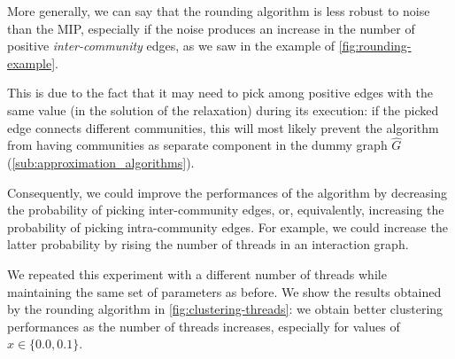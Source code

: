 More generally, we can say that the rounding algorithm is less robust to noise
than the MIP, especially if the noise produces an increase in the number of
positive \emph{inter-community} edges, as we saw in the example of
\autoref{fig:rounding-example}.

This is due to the fact that it may need to pick among positive edges with the
same value (in the solution of the relaxation) during its execution: if the picked edge connects different communities, this will most
likely prevent the algorithm from having communities as separate component in
the dummy graph $\hat{G}$ (\autoref{sub:approximation_algorithms}).



Consequently, we could improve the performances of the algorithm by decreasing the probability
of picking inter-community edges, or, equivalently, increasing the probability
of picking intra-community edges. For example, we could increase the latter probability
by rising the number of threads in an interaction graph.

We repeated this experiment with a different number of threads
while maintaining the same set of parameters as before. We show the results
obtained by the rounding algorithm in \autoref{fig:clustering-threads}: we obtain better clustering
performances as the number of threads increases, especially for values of
$x \in \{ 0.0, 0.1 \}$.

